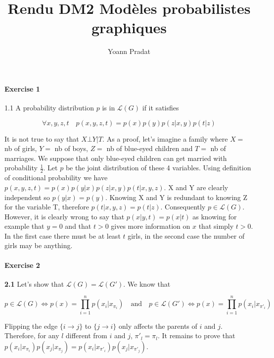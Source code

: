 \documentclass[a4paper, 11pt]{article}
\begin{document}
\title{Rendu DM2 Modèles probabilistes graphiques} 
\author{Yoann Pradat}
\maketitle

\paragraph{Exercise 1}

1.1 A probability distribution $p$ is in $\mathcal{L}(G)$ if it satisfies

\begin{equation}
  \forall x,y,z,t \quad p(x,y,z,t) = p(x)p(y)p(z|x,y)p(t|z) 
\end{equation}

It is not true to say that $X \bot Y | T$. As a proof, let's imagine a family where $X = $ nb of girls, $Y = $ nb of
boys, $Z =$ nb of blue-eyed children and $T =$ nb of marriages. We suppose that only blue-eyed children can get married 
with probability $\frac{1}{2}$. Let $p$ be the joint distribution of these 4 variables. Using definition of conditional 
probability we have $p(x,y,z,t) = p(x) p(y|x) p(z|x,y) p(t|x,y,z)$. X and Y are clearly independent so $p(y|x) = p(y)$.
Knowing X and Y is redundant to knowing Z for the variable T, therefore $p(t|x,y,z) = p(t|z)$. Consequently $p \in
\mathcal{L}(G)$. However, it is clearly wrong to say that $p(x|y,t) = p(x|t)$ as knowing for example that $y=0$ and that 
$t >0$ gives more information on $x$ that simply $t>0$. In the first case there must be at least $t$ girls, in the second
case the number of girls may be anything.

\clearpage

\paragraph{Exercise 2}

\textbf{2.1} Let's show that $\mathcal{L}(G) = \mathcal{L}(G')$. We know that

\begin{equation}
  p \in \mathcal{L}(G) \iff p(x) = \prod_{i=1}^n p(x_i|x_{\pi_i}) \quad \text{and} \quad  p \in \mathcal{L}(G') \iff
  p(x) = \prod_{i=1}^n p(x_i|x_{\pi'_i}) 
\end{equation}

Flipping the edge $\{i \to j\}$ to $\{j \to i\}$ only affects the parents of $i$ and $j$. Therefore, for any $l$
different from $i$ and $j$, $\pi'_l = \pi_l$. It remains to prove that $p(x_i|x_{\pi_i}) p(x_j|x_{\pi_j}) = 
p(x_i|x_{\pi'_i}) p(x_j|x_{\pi'_j})$. \\
\end{document}

